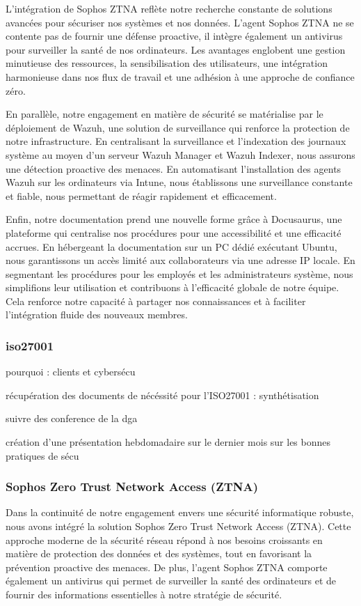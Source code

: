 L'intégration de Sophos ZTNA reflète notre recherche constante de solutions avancées pour sécuriser nos systèmes et nos données.
L'agent Sophos ZTNA ne se contente pas de fournir une défense proactive, il intègre également un antivirus pour surveiller la santé de nos ordinateurs.
Les avantages englobent une gestion minutieuse des ressources, la sensibilisation des utilisateurs, une intégration harmonieuse dans nos flux de travail et une adhésion à une approche de confiance zéro.

En parallèle, notre engagement en matière de sécurité se matérialise par le déploiement de Wazuh, une solution de surveillance qui renforce la protection de notre infrastructure.
En centralisant la surveillance et l'indexation des journaux système au moyen d'un serveur Wazuh Manager et Wazuh Indexer, nous assurons une détection proactive des menaces.
En automatisant l'installation des agents Wazuh sur les ordinateurs via Intune, nous établissons une surveillance constante et fiable, nous permettant de réagir rapidement et efficacement.

Enfin, notre documentation prend une nouvelle forme grâce à Docusaurus, une plateforme qui centralise nos procédures pour une accessibilité et une efficacité accrues.
En hébergeant la documentation sur un PC dédié exécutant Ubuntu, nous garantissons un accès limité aux collaborateurs via une adresse IP locale.
En segmentant les procédures pour les employés et les administrateurs système, nous simplifions leur utilisation et contribuons à l'efficacité globale de notre équipe.
Cela renforce notre capacité à partager nos connaissances et à faciliter l'intégration fluide des nouveaux membres.


\subsubsection{iso27001}
pourquoi : clients et cybersécu

récupération des documents de nécéssité pour l'ISO27001 : synthétisation

suivre des conference de la dga

création d'une présentation hebdomadaire sur le dernier mois sur les bonnes pratiques de sécu

\subsubsection{Sophos Zero Trust Network Access (ZTNA)}

Dans la continuité de notre engagement envers une sécurité informatique robuste, nous avons intégré la solution Sophos Zero Trust Network Access (ZTNA).
Cette approche moderne de la sécurité réseau répond à nos besoins croissants en matière de protection des données et des systèmes, tout en favorisant la prévention proactive des menaces.
De plus, l'agent Sophos ZTNA comporte également un antivirus qui permet de surveiller la santé des ordinateurs et de fournir des informations essentielles à notre stratégie de sécurité.

